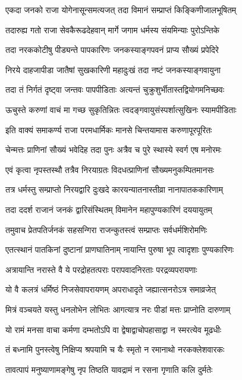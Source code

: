 \twolineshloka
{एकदा जनको राजा योगेनासून्समत्यजत्}
{तदा विमानं सम्प्राप्तं किङ्किणीजालभूषितम्}%

\twolineshloka
{तदारुह्य गतो राजा सेवकैरूढदेहवान्}
{मार्गे जगाम धर्मस्य संयमिन्याः पुरोऽन्तिके}%

\twolineshloka
{तदा नरककोटीषु पीड्यन्ते पापकारिणः}
{जनकस्याङ्गपवनं प्राप्य सौख्यं प्रपेदिरे}%

\twolineshloka
{निरये दाहजापीडा जातैषां सुखकारिणी}
{महादुःखं तदा नष्टं जनकस्याङ्गवायुना}%

\twolineshloka
{तदा तं निर्गतं दृष्ट्वा जन्तवः पापपीडिताः}
{अत्यन्तं चुक्रुशुर्भीतास्तद्वियोगमनिच्छवः}%

\twolineshloka
{ऊचुस्ते करुणां वाचं मा गच्छ सुकृतिन्नितः}
{त्वदङ्गवायुसंस्पर्शात्सुखिनः स्यामपीडिताः}%

\twolineshloka
{इति वाक्यं समाकर्ण्य राजा परमधार्मिकः}
{मानसे चिन्तयामास करुणापूरपूरितः}%

\twolineshloka
{चेन्मत्तः प्राणिनां सौख्यं भवेदिह तदा पुनः}
{अत्रैव च पुरे स्थास्ये स्वर्ग एष मनोरमः}%

\twolineshloka
{एवं कृत्वा नृपस्तस्थौ तत्रैव निरयाग्रतः}
{विदधत्प्राणिनां सौख्यमनुकम्पितमानसः}%

\twolineshloka
{तत्र धर्मस्तु सम्प्राप्तो निरयद्वारि दुःखदे}
{कारयन्यातनास्तीव्रा नानापातककारिणाम्}%

\twolineshloka
{तदा ददर्श राजानं जनकं द्वारिसंस्थितम्}
{विमानेन महापुण्यकारिणं दययायुतम्}%

\twolineshloka
{तमुवाच प्रेतपतिर्जनकं सहसन्गिरा}
{राजन्कुतस्त्वं सम्प्राप्तः सर्वधर्मशिरोमणिः}%

\twolineshloka
{एतत्स्थानं पातकिनां दुष्टानां प्राणघातिनाम्}
{नायान्ति पुरुषा भूप त्वादृशाः पुण्यकारिणः}%

\twolineshloka
{अत्रायान्ति नरास्ते वै ये परद्रोहतत्पराः}
{परापवादनिरताः परद्रव्यपरायणाः}%

\twolineshloka
{यो वै कलत्रं धर्मिष्ठं निजसेवापरायणम्}
{अपराधादृते जह्यात्सनरोऽत्र समाव्रजेत्}%

\twolineshloka
{मित्रं वञ्चयते यस्तु धनलोभेन लोभितः}
{आगत्यात्र नरः पीडां मत्तः प्राप्नोति दारुणाम्}%

\twolineshloka
{यो रामं मनसा वाचा कर्मणा दम्भतोऽपि वा}
{द्वेषाद्वाचोपहासाद्वा न स्मरत्येव मूढधीः}%

\twolineshloka
{तं बध्नामि पुनस्त्वेषु निक्षिप्य श्रपयामि च}
{यैः स्मृतो न रमानाथो नरकक्लेशवारकः}%

\twolineshloka
{तावत्पापं मनुष्याणामङ्गेषु नृप तिष्ठति}
{यावद्रामं न रसना गृणाति कलि दुर्मतेः}%

